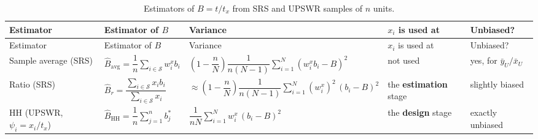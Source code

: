 \documentclass[
  letterpaper,
  DIV=11,
  numbers=noendperiod]{scrreprt}
\renewcommand{\[}{\begin{equation}}
\renewcommand{\]}{\end{equation}}
\begin{document}
\begin{longtable}[]{@{}
  >{\raggedright\arraybackslash}p{}
  >{\centering\arraybackslash}p{}
  >{\centering\arraybackslash}p{}
  >{\raggedright\arraybackslash}p{}
  >{\raggedright\arraybackslash}p{}@{}}
\caption{Estimators of \(B=t/t_x\) from SRS and UPSWR samples of \(n\)
units.}\label{tbl-ups-compare}\tabularnewline
\toprule\noalign{}
\begin{minipage}[b]{\linewidth}\raggedright
Estimator
\end{minipage} & \begin{minipage}[b]{\linewidth}\centering
Estimator of \(B\)
\end{minipage} & \begin{minipage}[b]{\linewidth}\centering
Variance
\end{minipage} & \begin{minipage}[b]{\linewidth}\raggedright
\(x_i\) is used at
\end{minipage} & \begin{minipage}[b]{\linewidth}\raggedright
Unbiased?
\end{minipage} \\
\midrule\noalign{}
\endfirsthead
\toprule\noalign{}
\begin{minipage}[b]{\linewidth}\raggedright
Estimator
\end{minipage} & \begin{minipage}[b]{\linewidth}\centering
Estimator of \(B\)
\end{minipage} & \begin{minipage}[b]{\linewidth}\centering
Variance
\end{minipage} & \begin{minipage}[b]{\linewidth}\raggedright
\(x_i\) is used at
\end{minipage} & \begin{minipage}[b]{\linewidth}\raggedright
Unbiased?
\end{minipage} \\
\midrule\noalign{}
\endhead
\bottomrule\noalign{}
\endlastfoot
Sample average (SRS) &
\(\hat{B}_{\mathrm{avg}}=\dfrac1n\sum\limits_{i\in\mathcal{S}}w^x_ib_i\)
&
\(\left(1-\dfrac{n}{N}\right)\dfrac{1}{n(N-1)}\sum\limits_{i=1}^N (w^x_ib_i-B)^2\)
& not used & yes, for \(\bar{y}_U/\bar{x}_U\) \\
Ratio (SRS) &
\(\hat{B}_r=\dfrac{\sum_{i\in\mathcal{S}} x_ib_i}{\sum_{i\in\mathcal{S}} x_i}\)
&
\(\approx\left(1-\dfrac{n}{N}\right)\dfrac{1}{n(N-1)}\sum\limits_{i=1}^N (w^x_i)^2\,(b_i-B)^2\)
& the \textbf{estimation} stage & slightly biased \\
HH (UPSWR, \(\psi_i=x_i/t_x\)) &
\(\hat{B}_{\mathrm{HH}}=\dfrac1n\sum\limits_{j=1}^n b_j^*\) &
\(\dfrac{1}{nN}\sum\limits_{i=1}^N w^x_i\,(b_i-B)^2\) & the
\textbf{design} stage & exactly unbiased \\
\end{longtable}
\end{document}
